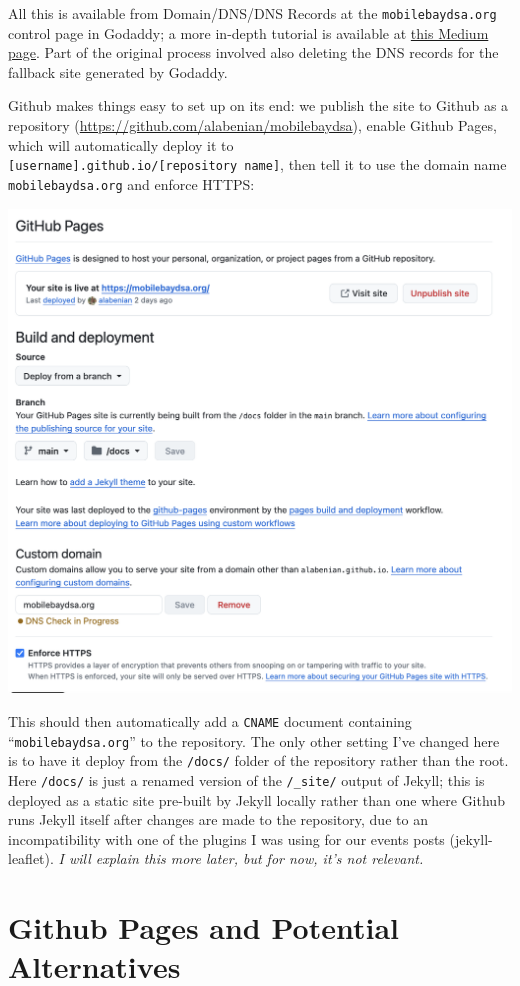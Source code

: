\documentclass[
]{book}
\begin{document}
All this is available from Domain/DNS/DNS Records at the \texttt{mobilebaydsa.org} control page in Godaddy; a more in-depth tutorial is available at \href{https://medium.com/@nbblks/how-to-set-up-godaddy-domain-with-github-pages-eaa65f88a8ec}{this Medium page}. Part of the original process involved also deleting the DNS records for the fallback site generated by Godaddy.

Github makes things easy to set up on its end: we publish the site to Github as a repository (\url{https://github.com/alabenian/mobilebaydsa}), enable Github Pages, which will automatically deploy it to \texttt{{[}username{]}.github.io/{[}repository\ name{]}}, then tell it to use the domain name \texttt{mobilebaydsa.org} and enforce HTTPS:

\includegraphics[width=0.75\linewidth,height=\textheight,keepaspectratio]{github-pages.png}

This should then automatically add a \texttt{CNAME} document containing ``\texttt{mobilebaydsa.org}'' to the repository. The only other setting I've changed here is to have it deploy from the \texttt{/docs/} folder of the repository rather than the root. Here \texttt{/docs/} is just a renamed version of the \texttt{/\_site/} output of Jekyll; this is deployed as a static site pre-built by Jekyll locally rather than one where Github runs Jekyll itself after changes are made to the repository, due to an incompatibility with one of the plugins I was using for our events posts (jekyll-leaflet). \emph{I will explain this more later, but for now, it's not relevant.}

\section{Github Pages and Potential Alternatives}\label{github-pages-and-potential-alternatives}
\end{document}
